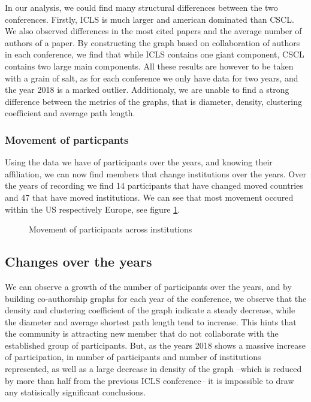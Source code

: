 \documentclass[article,twocolumn]{IEEEtran}
\begin{document}
In our analysis, we could find many structural differences between the
two conferences. Firstly, ICLS is much larger and american dominated
than CSCL. We also observed differences in the most cited papers and the
average number of authors of a paper. By constructing the graph based on
collaboration of authors in each conference, we find that while ICLS
contains one giant component, CSCL contains two large main components.
All these results are however to be taken with a grain of salt, as for
each conference we only have data for two years, and the year 2018 is a
marked outlier. Additionaly, we are unable to find a strong difference
between the metrics of the graphs, that is diameter, density, clustering
coefficient and average path length.

    \hypertarget{movement-of-particpants}{%
\subsubsection{Movement of particpants}\label{movement-of-particpants}}

Using the data we have of participants over the years, and knowing their
affiliation, we can now find members that change institutions over the
years. Over the years of recording we find 14 participants that have
changed moved countries and 47 that have moved institutions. We can see
that most movement occured within the US respectively Europe, see figure
\ref{fig_move}.


    \begin{figure}
        \begin{center}\end{center}
        \caption{Movement of participants across institutions}
        \label{fig_move}
    \end{figure}
    
    \hypertarget{changes-over-the-years}{%
\subsection{Changes over the years}\label{changes-over-the-years}}

We can observe a growth of the number of participants over the years,
and by building co-authorship graphs for each year of the conference, we
observe that the density and clustering coefficient of the graph
indicate a steady decrease, while the diameter and average shortest path
length tend to increase. This hints that the community is attracting new
member that do not collaborate with the established group of
participants. But, as the years 2018 shows a massive increase of
participation, in number of participants and number of institutions
represented, as well as a large decrease in density of the graph --which
is reduced by more than half from the previous ICLS conference-- it is
impossible to draw any statisically significant conclusions.
\end{document}
